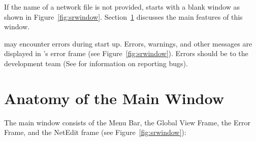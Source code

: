 If the name of a network file is not provided, \sr{} starts with
a blank window as shown in Figure~\ref{fig:srwindow}.
Section~\ref{sec:windowanatomy} discusses the main features of this
window.

\sr{} may encounter errors during start up.  Errors, warnings, and
other messages are displayed in
\sr{}'s error frame (see Figure~\ref{fig:srwindow}).   Errors
should be  to the \sr{} development
team (See  for information on
reporting bugs).

\section{Anatomy of the Main Window}
\label{sec:windowanatomy}

The \sr{} main window consists of the Menu Bar, the Global View Frame,
the Error Frame, and the NetEdit frame (see
Figure~\ref{fig:srwindow}):

